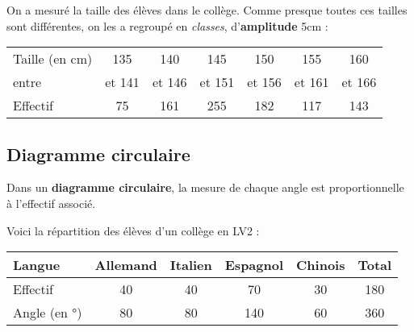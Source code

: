 \documentclass[../€Cours-complet/Cours-complet]{subfiles}
\begin{document}
\begin{exemple}
	On a mesuré la taille des élèves dans le collège. Comme presque toutes ces tailles sont différentes, on les a regroupé en \textit{classes}, d'\textbf{amplitude} 5cm :


	\begin{center}
		\begin{tabular}{|l|c|c|c|c|c|c|}
			\hline
			Taille (en cm) & 135    & 140    & 145    & 150    & 155    & 160
			\\
			entre          & et 141 & et 146 & et 151 & et 156 & et 161 & et 166
			\\ \hline
			Effectif       & 75     & 161    & 255    & 182    & 117    & 143    %
			\\ \hline
		\end{tabular}
	\end{center}

	\begin{center}
	\end{center}
\end{exemple}

\subsection{Diagramme circulaire}

Dans un \textbf{diagramme circulaire}, la mesure de chaque angle est proportionnelle à l'effectif associé.

\begin{exemple}
	Voici la répartition des élèves d'un collège en LV2 :

	\begin{center}
		\begin{tabular}{|l|c|c|c|c|c|}
			\hline
			Langue       & Allemand & Italien & Espagnol & Chinois & \textbf{Total}
			\\ \hline
			Effectif     & 40       & 40      & 70       & 30      & 180
			\\ \hline
			Angle (en °) & 80       & 80      & 140      & 60      & 360
			\\ \hline
		\end{tabular}
	\end{center}

	\begin{center}
	\end{center}
\end{exemple}
\end{document}
